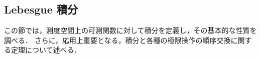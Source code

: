 \subsection{Lebesgue 積分}\label{sec:integration}

この節では，測度空間上の可測関数に対して積分を定義し，その基本的な性質を調べる．
さらに，応用上重要となる，積分と各種の極限操作の順序交換に関する定理について述べる．



